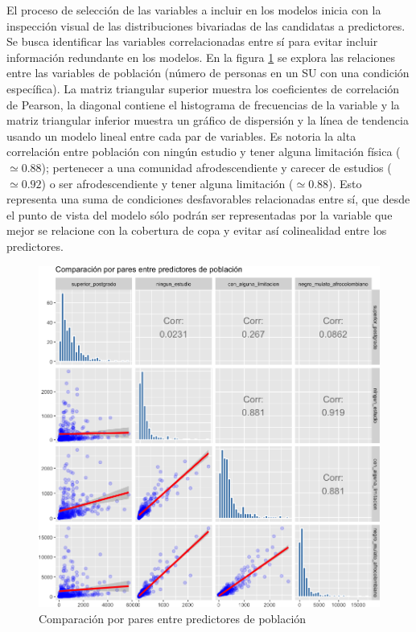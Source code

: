 \documentclass[12pt,a4paper,oneside, openany]{book}
\theoremstyle{definition}
\theoremstyle{definition}
\theoremstyle{definition}
\theoremstyle{remark}
\begin{document}
El proceso de selección de las variables a incluir en los modelos inicia
con la inspección visual de las distribuciones bivariadas de las
candidatas a predictores. Se busca identificar las variables
correlacionadas entre sí para evitar incluir información redundante en
los modelos. En la figura \ref{fig:bivar-poblacion-abs} se explora las
relaciones entre las variables de población (número de personas en un SU
con una condición específica). La matriz triangular superior muestra los
coeficientes de correlación de Pearson, la diagonal contiene el
histograma de frecuencias de la variable y la matriz triangular inferior
muestra un gráfico de dispersión y la línea de tendencia usando un
modelo lineal entre cada par de variables. Es notoria la alta
correlación entre población con ningún estudio y tener alguna limitación
física (\(\simeq 0.88\)); pertenecer a una comunidad afrodescendiente y
carecer de estudios (\(\simeq0.92\)) o ser afrodescendiente y tener
alguna limitación (\(\simeq0.88\)). Esto representa una suma de
condiciones desfavorables relacionadas entre sí, que desde el punto de
vista del modelo sólo podrán ser representadas por la variable que mejor
se relacione con la cobertura de copa y evitar así colinealidad entre
los predictores.

\begin{figure}[H]

{\centering \includegraphics[width=1\linewidth]{tesis-unigis_files/figure-latex/bivar-poblacion-abs-1} 

}

\caption{Comparación por pares entre predictores de población}\label{fig:bivar-poblacion-abs}
\end{figure}
\end{document}
